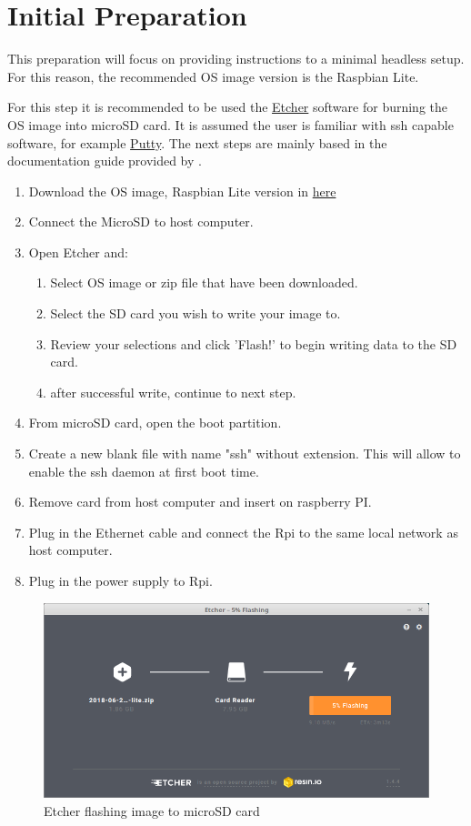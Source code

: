 \section{Initial Preparation}
This preparation will focus on providing instructions to a minimal headless setup. For this reason, the recommended \gls{OS} image version is the Raspbian Lite.

For this step it is recommended to be used the \href{https://etcher.io/}{Etcher} software for burning the \gls{OS} image into microSD card. It is assumed the user is familiar with ssh capable software, for example \href{https://www.putty.org/}{Putty}. 
The next steps are mainly based in the documentation guide provided by \cite{raspberry_install_guide}.

\begin{enumerate}
	\tightlist
	\item Download the \gls{OS} image, Raspbian Lite version in \href{https://www.raspberrypi.org/downloads/raspbian/}{here}
	\item Connect the MicroSD to host computer.
	\item Open Etcher and:
	\begin{enumerate}
		\item Select \gls{OS} image or zip file that have been downloaded.
		\item Select the SD card you wish to write your image to.
		\item Review your selections and click 'Flash!' to begin writing data to the SD card.
		\item after successful write, continue to next step.
	\end{enumerate}
	\item From microSD card, open the boot partition.
	\item Create a new blank file with name "ssh" without extension. This will allow to enable the ssh daemon at first boot time.
	\item Remove card from host computer and insert on raspberry PI.
	\item Plug in the Ethernet cable and connect the \gls{Rpi} to the same  local network as host computer.
	\item Plug in the power supply to \gls{Rpi}.
\end{enumerate}

\begin{figure}
	\centering
	\includegraphics[width=0.5\linewidth]{figures/Etcher_flashing.png}
	\caption{Etcher flashing image to microSD card}
	\label{fig:etcher_flashing}
\end{figure}

